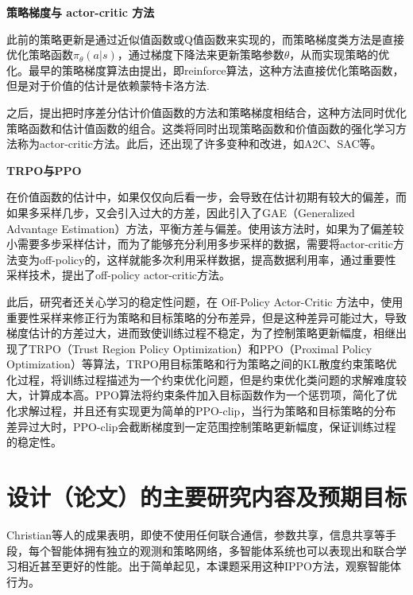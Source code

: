 \documentclass[12pt,a4paper,UTF8]{ctexart}
\numberwithin{equation}{section}
\begin{document}
\textbf{策略梯度与 actor-critic 方法}

此前的策略更新是通过近似值函数或Q值函数来实现的，而策略梯度类方法是直接优化策略函数$\pi_\theta(a|s)$，通过梯度下降法来更新策略参数$\theta$，从而实现策略的优化。最早的策略梯度算法由\cite{williams1992simple}提出，即reinforce算法，这种方法直接优化策略函数，但是对于价值的估计是依赖蒙特卡洛方法.

之后，\cite{sutton1999policyandvalue}提出把时序差分估计价值函数的方法和策略梯度相结合，这种方法同时优化策略函数和估计值函数的组合。这类将同时出现策略函数和价值函数的强化学习方法称为actor-critic方法。此后，还出现了许多变种和改进，如A2C、SAC等。

\textbf{TRPO与PPO}

在价值函数的估计中，如果仅仅向后看一步，会导致在估计初期有较大的偏差，而如果多采样几步，又会引入过大的方差，因此引入了GAE（Generalized Advantage Estimation）方法\cite{schulman2016gae}，平衡方差与偏差。使用该方法时，如果为了偏差较小需要多步采样估计，而为了能够充分利用多步采样的数据，需要将actor-critic方法变为off-policy的，这样就能多次利用采样数据，提高数据利用率，\cite{degris2013offpolicyactorcritic}通过重要性采样技术，提出了off-policy actor-critic方法。

此后，研究者还关心学习的稳定性问题，在 Off-Policy Actor-Critic 方法中，使用重要性采样来修正行为策略和目标策略的分布差异，但是这种差异可能过大，导致梯度估计的方差过大，进而致使训练过程不稳定，为了控制策略更新幅度，相继出现了TRPO（Trust Region Policy Optimization）和PPO（Proximal Policy Optimization）等算法，TRPO用目标策略和行为策略之间的KL散度约束策略优化过程，将训练过程描述为一个约束优化问题，但是约束优化类问题的求解难度较大，计算成本高。PPO算法将约束条件加入目标函数作为一个惩罚项，简化了优化求解过程，并且还有实现更为简单的PPO-clip，当行为策略和目标策略的分布差异过大时，PPO-clip会截断梯度到一定范围控制策略更新幅度，保证训练过程的稳定性。

\section{设计（论文）的主要研究内容及预期目标}

Christian等人\cite{dewitt2020independentlearningneedstarcraft}的成果表明，即使不使用任何联合通信，参数共享，信息共享等手段，每个智能体拥有独立的观测和策略网络，多智能体系统也可以表现出和联合学习相近甚至更好的性能。出于简单起见，本课题采用这种IPPO方法，观察智能体行为。
\end{document}
